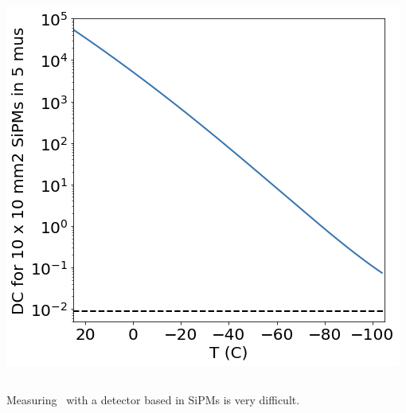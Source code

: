 \begin{frame}
\begin{columns}
\includegraphics[scale=0.3]{img/dcr5mus.png}

\end{columns}

\blt Measuring \tz\ with a detector based in SiPMs is very difficult. 
\end{frame}


